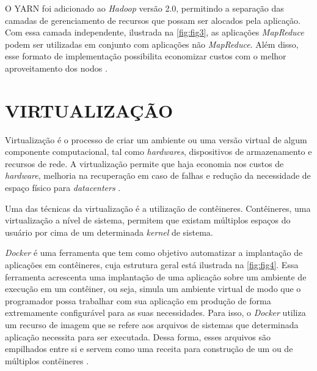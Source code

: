 O YARN foi adicionado ao \textit{Hadoop} versão 2.0, permitindo a separação das camadas de gerenciamento de recursos que possam ser alocados pela aplicação. Com essa camada independente, ilustrada na \autoref{fig:fig3}, as aplicações \textit{MapReduce} podem ser utilizadas em conjunto com aplicações não \textit{MapReduce}. Além disso, esse formato de implementação possibilita economizar custos com o melhor aproveitamento dos nodos \cite{KobylinskaMartins14}. 


\newpage
\section{VIRTUALIZAÇÃO} \label{sec:virtualizacao}

Virtualização é o processo de criar um ambiente ou uma versão virtual de algum componente computacional, tal como \textit{\gls{hardware}s}, dispositivos de armazenamento e recursos de rede. A virtualização permite que haja economia nos custos de \textit{\gls{hardware}}, melhoria na recuperação em caso de falhas e redução da necessidade de espaço físico para \textit{\gls{datacenters}} \cite{PortnoyVirtualization12}. 

Uma das técnicas da virtualização é a utilização de contêineres. Contêineres, uma virtualização a nível de sistema, permitem que existam múltiplos espaços do usuário por cima de um determinada \textit{\gls{kernel}} de sistema. 

\newpage
\textit{Docker} é uma ferramenta que tem como objetivo automatizar a implantação de aplicações em contêineres, cuja estrutura geral está ilustrada na \autoref{fig:fig4}. Essa ferramenta acrescenta uma implantação de uma aplicação sobre um ambiente de execução em um contêiner, ou seja, simula um ambiente virtual de modo que o programador possa trabalhar com sua aplicação em produção de forma extremamente configurável para as suas necessidades. Para isso, o \textit{Docker} utiliza um recurso de imagem que se refere aos arquivos de sistemas que determinada aplicação necessita para ser executada. Dessa forma, esses arquivos são empilhados entre si e servem como uma receita para construção de um ou de múltiplos contêineres \cite{DockerBook14}.

